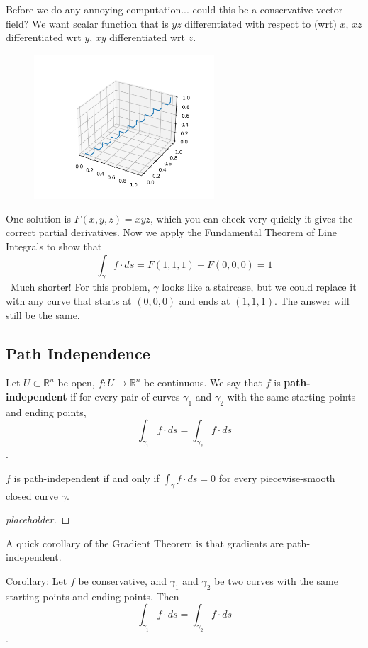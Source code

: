 \documentclass[11pt,openany]{book}
\newcommand{\definition}[2]{\begin{tcolorbox}[title=Definition ({#1}),colframe=black]{#2}\end{tcolorbox}
}
\newcommand{\proposition}[1]{\begin{tcolorbox}[title=Proposition,colframe=red!50!blue!20!white,colback=red!35!blue!10!white, coltitle=black]{#1}\end{tcolorbox}
}
\newcommand{\corollary}[1]{\begin{tcolorbox}[]{Corollary: {#1}}\end{tcolorbox}
}
\begin{document}
	Before we do any annoying computation... could this be a conservative vector field? We want scalar function that is $yz$ differentiated with respect to (wrt) $x$, $xz$ differentiated wrt $y$, $xy$ differentiated wrt $z$.
	\begin{figure}
		\centering
		\includegraphics[width=0.6\textwidth]{staircase.png}
	\end{figure}
	One solution is $F(x,y,z)=xyz$, which you can check very quickly it gives the correct partial derivatives.
	Now we apply the Fundamental Theorem of Line Integrals to show that
	\[
	\int_{\gamma} f\cdot ds = F(1,1,1) - F(0,0,0) = 1
	\]\
	 Much shorter!
	For this problem, $\gamma$ looks like a staircase, but we could replace it with any curve that starts at $(0,0,0)$ and ends at $(1,1,1)$. The answer will still be the same.
	\subsection{Path Independence}
	\definition{Path Independent Vector Fields}{
		Let $U\subset\mathbb{R}^n$ be open, $f:U\to\mathbb{R}^n$ be continuous. We say that $f$ is \textbf{path-independent} if for every pair of curves
		$\gamma_1$ and $\gamma_2$ with the same starting points and ending points, \[
		\int_{\gamma_1} f \cdot ds = \int_{\gamma_2} f \cdot ds
	\].
	}
	\proposition{
		$f$ is path-independent if and only if $\int_\gamma f\cdot ds =0$ for every piecewise-smooth closed curve $\gamma$.
	}
	\begin{proof}
		[placeholder]
	\end{proof}
	A quick corollary of the Gradient Theorem is that gradients are path-independent.
	\corollary{
	Let $f$ be conservative, and $\gamma_1$ and $\gamma_2$ be two curves with the same starting points and ending points. Then \[
		\int_{\gamma_1} f \cdot ds = \int_{\gamma_2} f \cdot ds
	\].
	}
	
\end{document}
